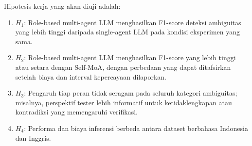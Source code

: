Hipotesis kerja yang akan diuji adalah:
\begin{enumerate}
\item $H_1$: Role-based multi-agent LLM menghasilkan F1-score deteksi ambiguitas yang lebih tinggi daripada single-agent LLM pada kondisi eksperimen yang sama.
\item $H_2$: Role-based multi-agent LLM menghasilkan F1-score yang lebih tinggi atau setara dengan Self-MoA, dengan perbedaan yang dapat ditafsirkan setelah biaya dan interval kepercayaan dilaporkan.
\item $H_3$: Pengaruh tiap peran tidak seragam pada seluruh kategori ambiguitas; misalnya, perspektif tester lebih informatif untuk ketidaklengkapan atau kontradiksi yang memengaruhi verifikasi.
\item $H_4$: Performa dan biaya inferensi berbeda antara dataset berbahasa Indonesia dan Inggris.
\end{enumerate}
